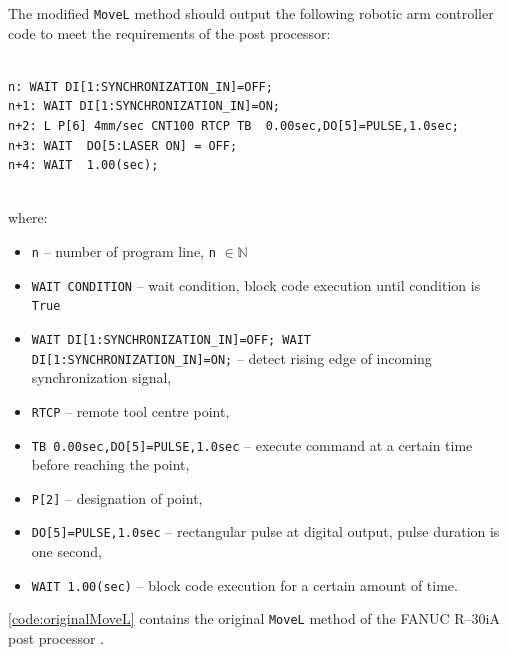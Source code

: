 The modified \texttt{MoveL} method should output the following robotic arm controller code to meet the requirements of the post processor:


\begin{verbatim}

n: WAIT DI[1:SYNCHRONIZATION_IN]=OFF;
n+1: WAIT DI[1:SYNCHRONIZATION_IN]=ON;
n+2: L P[6] 4mm/sec CNT100 RTCP TB  0.00sec,DO[5]=PULSE,1.0sec;
n+3: WAIT  DO[5:LASER ON] = OFF;
n+4: WAIT  1.00(sec);
  
\end{verbatim}


where:

\begin{itemize}

    \item \texttt{n} -- number of program line, \texttt{n} $\in \mathbb{N}$
    \item \texttt{WAIT CONDITION} -- wait condition, block code execution until condition  is \texttt{True}
    \item \texttt{WAIT DI[1:SYNCHRONIZATION_IN]=OFF; WAIT DI[1:SYNCHRONIZATION_IN]=ON;} -- detect rising edge of incoming synchronization signal,
    \item \texttt{RTCP} -- remote tool centre point,
    \item \texttt{TB  0.00sec,DO[5]=PULSE,1.0sec} -- execute command at a certain time before reaching the point,
    \item \texttt{P[2]} -- designation of point,
    \item \texttt{DO[5]=PULSE,1.0sec} -- rectangular pulse at digital output, pulse duration is one second, 
    \item \texttt{WAIT  1.00(sec)} -- block code execution for a certain amount of time.

\end{itemize}

 \ref{code:originalMoveL} contains the original \texttt{MoveL} method of the FANUC R--30iA post processor \cite{postmethods}. 


